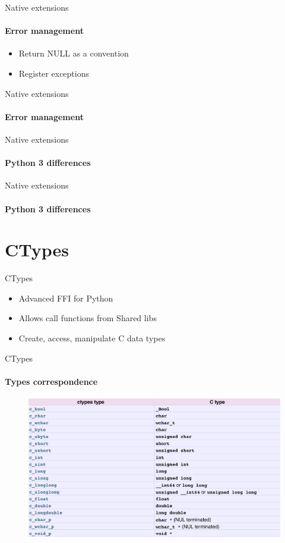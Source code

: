 \documentclass{beamer}
\begin{document}
\begin{frame}{Native extensions}
  \framesubtitle{Error management}
  \begin{itemize}
  \item Return NULL as a convention
  \item Register exceptions
  \end{itemize}
\end{frame}

\begin{frame}{Native extensions}
  \framesubtitle{Error management}
  \begin{block}{}
    \lsterror
  \end{block}
\end{frame}


\begin{frame}{Native extensions}
  \framesubtitle{Python 3 differences}
  \begin{block}{}
    \lstpythree
  \end{block}
\end{frame}

\begin{frame}{Native extensions}
  \framesubtitle{Python 3 differences}
  \begin{block}{}
    \lstpythreetwo
  \end{block}
\end{frame}

\section{CTypes}
\begin{frame}{CTypes}
  \begin{itemize}
   \item Advanced FFI for Python
   \item Allows call functions from Shared libs
   \item Create, access, manipulate C data types
  \end{itemize}
\end{frame}

\begin{frame}{CTypes}
  \framesubtitle{Types correspondence}
    \begin{figure}
      \includegraphics[width=0.9\linewidth]{ctypes.png}
    \end{figure}
\end{frame}
\end{document}

